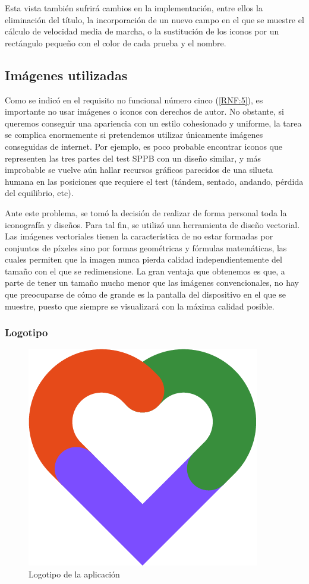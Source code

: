 Esta vista también sufrirá cambios en la implementación, entre ellos la eliminación del título, la incorporación de un nuevo campo en el que se muestre el cálculo de velocidad media de marcha, o la sustitución de los iconos por un rectángulo pequeño con el color de cada prueba y el nombre.

\subsection{Imágenes utilizadas}

Como se indicó en el requisito no funcional número cinco (\ref{RNF:5}), es importante no usar imágenes o iconos con derechos de autor. No obstante, si queremos conseguir una apariencia con un estilo cohesionado y uniforme, la tarea se complica enormemente si pretendemos utilizar únicamente imágenes conseguidas de internet. Por ejemplo, es poco probable encontrar iconos que representen las tres partes del test SPPB con un diseño similar, y más improbable se vuelve aún hallar recursos gráficos parecidos de una silueta humana en las posiciones que requiere el test (tándem, sentado, andando, pérdida del equilibrio, etc).

Ante este problema, se tomó la decisión de realizar de forma personal toda la iconografía y diseños. Para tal fin, se utilizó una herramienta de diseño vectorial. Las imágenes vectoriales tienen la característica de no estar formadas por conjuntos de píxeles sino por formas geométricas y fórmulas matemáticas, las cuales permiten que la imagen nunca pierda calidad independientemente del tamaño con el que se redimensione. La gran ventaja que obtenemos es que, a parte de tener un tamaño mucho menor que las imágenes convencionales, no hay que preocuparse de cómo de grande es la pantalla del dispositivo en el que se muestre, puesto que siempre se visualizará con la máxima calidad posible\cite{vectorial}.

\subsubsection{Logotipo}

\begin{figure}[H]
	\centering
	\includegraphics[scale=0.5]{imagenes/icon_small.png}
	\caption{Logotipo de la aplicación\label{fig:logo}}
\end{figure}

